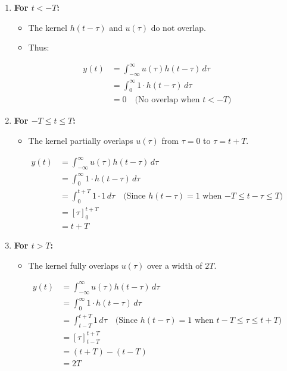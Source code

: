 \documentclass[12pt,a4paper,titlepage]{article}
\begin{document}
\begin{enumerate}
    \item \textbf{For \( t < -T \):}
    \begin{itemize}
        \item The kernel \( h(t - \tau) \) and \( u(\tau) \) do not overlap.
        \item Thus:
    \end{itemize}
    
    \begin{align}
        y(t) &= \int_{-\infty}^{\infty} u(\tau) h(t - \tau) \, d\tau \\
        &= \int_{0}^{\infty} 1 \cdot h(t - \tau) \, d\tau \\
        &= 0 \quad \text{(No overlap when $t < -T$)}
    \end{align}
    
    \item \textbf{For \( -T \leq t \leq T \):}
    \begin{itemize}
        \item The kernel partially overlaps \( u(\tau) \) from \( \tau = 0 \) to \( \tau = t + T \).
    \end{itemize}
    
    \begin{align}
        y(t) &= \int_{-\infty}^{\infty} u(\tau) h(t - \tau) \, d\tau \\
        &= \int_{0}^{\infty} 1 \cdot h(t - \tau) \, d\tau \\
        &= \int_{0}^{t+T} 1 \cdot 1 \, d\tau \quad \text{(Since $h(t-\tau)=1$ when $-T \leq t-\tau \leq T$)} \\
        &= [{\tau}]_{0}^{t+T} \\
        &= t + T
    \end{align}
    
    \item \textbf{For \( t > T \):}
    \begin{itemize}
        \item The kernel fully overlaps \( u(\tau) \) over a width of \( 2T \).
    \end{itemize}
    
    \begin{align}
        y(t) &= \int_{-\infty}^{\infty} u(\tau) h(t - \tau) \, d\tau \\
        &= \int_{0}^{\infty} 1 \cdot h(t - \tau) \, d\tau \\
        &= \int_{t-T}^{t+T} 1 \, d\tau \quad \text{(Since $h(t-\tau)=1$ when $t-T \leq \tau \leq t+T$)} \\
        &= [{\tau}]_{t-T}^{t+T} \\
        &= (t+T) - (t-T) \\
        &= 2T
    \end{align}
\end{enumerate}
\end{document}
